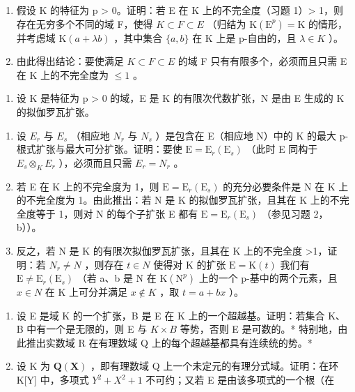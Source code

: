 \begin{enumerate}
\def\labelenumi{\alph{enumi})}
\item
  假设 K 的特征为 p \textgreater{} 0。证明：若 E 在 K 上的不完全度（习题 1）\textgreater{} 1，则存在无穷多个不同的域 F，使得 \(K \subset F \subset E\) （归结为 \(\mathrm{K}(\mathrm{E}^{p}) = \mathrm{K}\) 的情形，并考虑域 \(\mathrm{K}(a + \lambda b)\) ，其中集合 \(\{a, b\}\) 在 K 上是 p-自由的，且 \(\lambda \in K\) ）。
\item
  由此得出结论：要使满足 \(K \subset F \subset E\) 的域 F 只有有限多个，必须而且只需 E 在 K 上的不完全度为 \(\leqslant 1\) 。
\end{enumerate}

\begin{enumerate}
\def\labelenumi{\arabic{enumi})}
\setcounter{enumi}{5}
\tightlist
\item
  设 K 是特征为 p \textgreater{} 0 的域，E 是 K 的有限次代数扩张，N 是由 E 生成的 K 的拟伽罗瓦扩张。
\end{enumerate}

\begin{enumerate}
\def\labelenumi{\alph{enumi})}
\item
  设 \(E_{r}\) 与 \(E_{s}\) （相应地 \(N_{r}\) 与 \(N_{s}\) ）是包含在 E（相应地 N）中的 K 的最大 p-根式扩张与最大可分扩张。证明：要使 \(\mathrm{E} = \mathrm{E}_{r}(\mathrm{E}_{s})\) （此时 E 同构于 \(E_{s} \otimes_{K} E_{r}\) ），必须而且只需 \(E_{r} = N_{r}\) 。
\item
  若 E 在 K 上的不完全度为 1，则 \(\mathrm{E} = \mathrm{E}_{r}(\mathrm{E}_{s})\) 的充分必要条件是 N 在 K 上的不完全度为 1。由此推出：若 N 是 K 的拟伽罗瓦扩张，且其在 K 上的不完全度等于 1，则对 N 的每个子扩张 E 都有 \(\mathrm{E} = \mathrm{E}_{r}(\mathrm{E}_{s})\) （参见习题 2，b））。
\item
  反之，若 N 是 K 的有限次拟伽罗瓦扩张，且其在 K 上的不完全度 \textgreater1，证明：若 \(N_{r} \neq N\) ，则存在 \(t \in N\) 使得对 K 的扩张 \(\mathrm{E} = \mathrm{K}(t)\) 我们有 \(\mathrm{E} \neq \mathrm{E}_{r}(\mathrm{E}_{s})\) （若 a、b 是 N 在 \(\mathrm{K}(\mathrm{N}^{p})\) 上的一个 p-基中的两个元素，且 \(x \in N\) 在 K 上可分并满足 \(x \notin K\) ，取 \(t = a + bx\) ）。
\end{enumerate}

\BourbakiExerciseGroup

\begin{enumerate}
\def\labelenumi{\arabic{enumi})}
\item
  设 E 是域 K 的一个扩张，B 是 E 在 K 上的一个超越基。证明：若集合 K、B 中有一个是无限的，则 E 与 \(K \times B\) 等势，否则 E 是可数的。* 特别地，由此推出实数域 R 在有理数域 Q 上的每个超越基都具有连续统的势。*
\item
  设 K 为 \(\mathbf{Q}(\mathbf{X})\) ，即有理数域 Q 上一个未定元的有理分式域。证明：在环 K{[}Y{]} 中，多项式 \(Y^{2} + X^{2} + 1\) 不可约；又若 E 是由该多项式的一个根（在
\end{enumerate}

